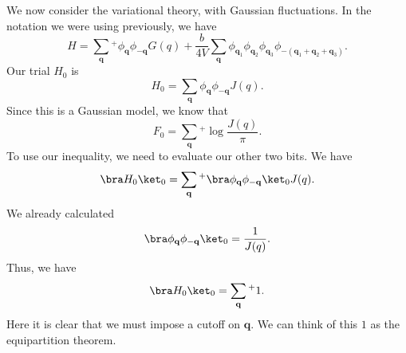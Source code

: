 \documentclass[a4paper]{article}
\begin{document}
\begin{center}
\end{center}
We now consider the variational theory, with Gaussian fluctuations. In the notation we were using previously, we have
\[
  H = \sum_\mathbf{q} {}^+ \phi_\mathbf{q} \phi_{-\mathbf{q}} G(q) + \frac{b}{4V} \sum_\mathbf{q} \phi_{\mathbf{q}_1} \phi_{\mathbf{q}_2} \phi_{\mathbf{q}_3} \phi_{-(\mathbf{q}_1 + \mathbf{q}_2 + \mathbf{q}_3)}.
\]
Our trial $H_0$ is
\[
  H_0 = \sum_\mathbf{q} \phi_\mathbf{q} \phi_{-\mathbf{q}} J(q).
\]
Since this is a Gaussian model, we know that
\[
  F_0 = \sum_{\mathbf{q}} {}^+ \log \frac{J(q)}{\pi}.
\]
To use our inequality, we need to evaluate our other two bits. We have
\[
  \bra H_0\ket_0 = \sum_{\mathbf{q}}{}^+ \bra \phi_\mathbf{q} \phi_{-\mathbf{q}}\ket_0 J(q).
\]
We already calculated
\[
  \bra \phi_{\mathbf{q}} \phi_{-\mathbf{q}} \ket_0 = \frac{1}{J(q)}.
\]
Thus, we have
\[
  \bra H_0 \ket_0 = \sum_{\mathbf{q}} {}^+ 1.
\]
Here it is clear that we must impose a cutoff on $\mathbf{q}$. We can think of this $1$ as the equipartition theorem.
\end{document}
